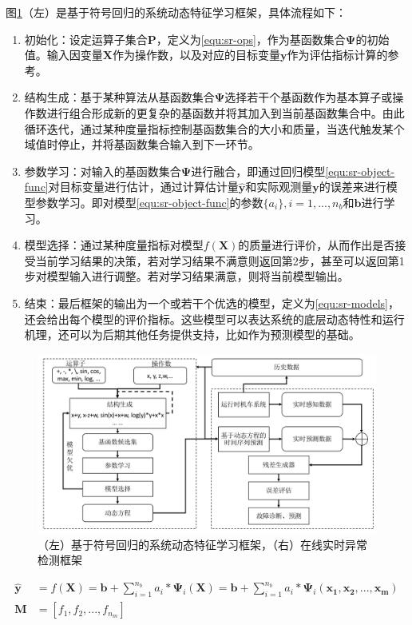 图\ref{fig:sr-anomaly-framework}（左）是基于符号回归的系统动态特征学习框架，具体流程如下：
\begin{enumerate}[1.]
  \item 初始化：设定运算子集合$\mathbf{P}$，定义为\ref{equ:sr-ops}，作为基函数集合$\mathbf{\Psi}$的初始值。输入因变量$\mathbf{X}$作为操作数，以及对应的目标变量$\mathbf{y}$作为评估指标计算的参考。
  \item 结构生成：基于某种算法从基函数集合$\mathbf{\Psi}$选择若干个基函数作为基本算子或操作数进行组合形成新的更复杂的基函数并将其加入到当前基函数集合中。由此循环迭代，通过某种度量指标控制基函数集合的大小和质量，当迭代触发某个域值时停止，并将基函数集合输入到下一环节。
  \item 参数学习：对输入的基函数集合$\mathbf{\Psi}$进行融合，即通过回归模型\ref{equ:sr-object-func}对目标变量进行估计，通过计算估计量$\mathbf{\hat{y}}$和实际观测量$\mathbf{y}$的误差来进行模型参数学习。即对模型\ref{equ:sr-object-func}的参数$\{a_{i}\},i=1,...,n_{b}$和$\mathbf{b}$进行学习。
  \item 模型选择：通过某种度量指标对模型$f(\mathbf{X})$的质量进行评价，从而作出是否接受当前学习结果的决策，若对学习结果不满意则返回第2步，甚至可以返回第1步对模型输入进行调整。若对学习结果满意，则将当前模型输出。
  \item 结束：最后框架的输出为一个或若干个优选的模型，定义为\ref{equ:sr-models}，还会给出每个模型的评价指标。这些模型可以表达系统的底层动态特性和运行机理，还可以为后期其他任务提供支持，比如作为预测模型的基础。
\end{enumerate}
\begin{figure}[H]
\centering
\includegraphics[scale=0.5]{figures/sr-anomaly-framework.png}
\caption{（左）基于符号回归的系统动态特征学习框架，（右）在线实时异常检测框架}
\label{fig:sr-anomaly-framework}
\end{figure}
\begin{subequations}
\begin{align}
\mathbf{\hat{y}} &= f(\mathbf{X}) = \mathbf{b} + \sum_{i=1}^{n_{b}}a_{i} \ast \mathbf{\Psi}_{i}(\mathbf{X}) =  \mathbf{b} + \sum_{i=1}^{n_{b}}a_{i} \ast \mathbf{\Psi}_{i}(\mathbf{\mathbf{x_{1}}, \mathbf{x_{2}}, ..., \mathbf{x_{m}}}) \label{equ:sr-object-func} \\
\mathbf{M} &= [f_{1}, f_{2}, ..., f_{n_m}] \label{equ:sr-models} 
\end{align}
\end{subequations}

